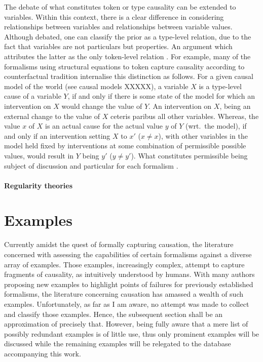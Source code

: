 \documentclass[11pt,a4paper]{book}
\theoremstyle{definition}
\theoremstyle{definition}
\theoremstyle{definition}
\theoremstyle{remark}
\begin{document}
The debate of what constitutes token or type causality can be extended to variables. Within this context, there is a clear difference in considering relationships between variables and relationships between variable values.
Although debated, one can classify the prior as a type-level relation, due to the fact that variables are not particulars but properties. An argument which attributes the latter as the only token-level relation \cite{hausman2005causal}.
For example, many of the formalisms using structural equations to token capture causality according to counterfactual tradition internalise this distinction as follows.
For a given causal model of the world (see causal models XXXXX), a variable $X$ is a type-level cause of a variable $Y$, if and only if there is some state of the model for which an intervention on $X$ would change the value of $Y$. An intervention on $X$, being an external change to the value of $X$ ceteris paribus all other variables. 
Whereas, the value $x$ of $X$ is an actual cause for the actual value $y$ of $Y$ (wrt.\ the model), if and only if an intervention setting $X$ to $x'$ ($x \neq x$), with other variables in the model held fixed by interventions at some combination of permissible possible values, would result in $Y$ being $y'$ ($y\neq y'$). What constitutes permissible being subject of discussion and particular for each formalism \cite{Weslake2015partialtheory}.



\paragraph{Regularity theories}






\section{Examples}
\label{sec:causation:examples}
Currently amidst the quest of formally capturing causation, the literature concerned with assessing the capabilities of certain formalisms against a diverse array of examples.
Those examples, increasingly complex, attempt to capture fragments of causality, as intuitively understood by humans. With many authors proposing new examples to highlight points of failures for previously established formalisms, the literature concerning causation has amassed a wealth of such examples. Unfortunately, as far as I am aware, no attempt was made to collect and classify those examples. Hence, the subsequent section shall be an approximation of precisely that. However, being fully aware that a mere list of possibly redundant examples is of little use, thus only prominent examples will be discussed while the remaining examples will be relegated to the database accompanying this work.
\end{document}
